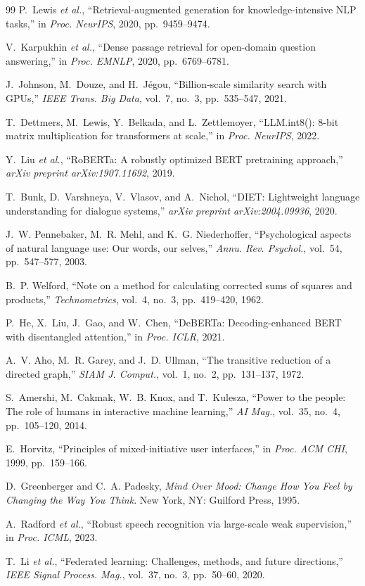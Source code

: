\documentclass[12pt, letterpaper]{article}
\begin{document}
\begin{thebibliography}{99}
P.~Lewis \textit{et al.},
``Retrieval-augmented generation for knowledge-intensive
NLP tasks,''
in \textit{Proc. NeurIPS}, 2020, pp.~9459--9474.

V.~Karpukhin \textit{et al.},
``Dense passage retrieval for open-domain question
answering,''
in \textit{Proc. EMNLP}, 2020, pp.~6769--6781.

J.~Johnson, M.~Douze, and H.~J\'{e}gou,
``Billion-scale similarity search with GPUs,''
\textit{IEEE Trans. Big Data},
vol.~7, no.~3, pp.~535--547, 2021.

T.~Dettmers, M.~Lewis, Y.~Belkada, and L.~Zettlemoyer,
``LLM.int8(): 8-bit matrix multiplication for transformers
at scale,''
in \textit{Proc. NeurIPS}, 2022.

Y.~Liu \textit{et al.},
``RoBERTa: A robustly optimized BERT pretraining approach,''
\textit{arXiv preprint arXiv:1907.11692}, 2019.

T.~Bunk, D.~Varshneya, V.~Vlasov, and A.~Nichol,
``DIET: Lightweight language understanding for dialogue
systems,''
\textit{arXiv preprint arXiv:2004.09936}, 2020.

J.~W. Pennebaker, M.~R. Mehl, and K.~G. Niederhoffer,
``Psychological aspects of natural language use: Our words,
our selves,''
\textit{Annu. Rev. Psychol.},
vol.~54, pp.~547--577, 2003.

B.~P. Welford,
``Note on a method for calculating corrected sums of squares
and products,''
\textit{Technometrics},
vol.~4, no.~3, pp.~419--420, 1962.

P.~He, X.~Liu, J.~Gao, and W.~Chen,
``DeBERTa: Decoding-enhanced BERT with disentangled
attention,''
in \textit{Proc. ICLR}, 2021.

A.~V. Aho, M.~R. Garey, and J.~D. Ullman,
``The transitive reduction of a directed graph,''
\textit{SIAM J. Comput.},
vol.~1, no.~2, pp.~131--137, 1972.

S.~Amershi, M.~Cakmak, W.~B. Knox, and T.~Kulesza,
``Power to the people: The role of humans in interactive
machine learning,''
\textit{AI Mag.}, vol.~35, no.~4, pp.~105--120, 2014.

E.~Horvitz,
``Principles of mixed-initiative user interfaces,''
in \textit{Proc. ACM CHI}, 1999, pp.~159--166.

D.~Greenberger and C.~A. Padesky,
\textit{Mind Over Mood: Change How You Feel by Changing
the Way You Think}.
New York, NY: Guilford Press, 1995.

A.~Radford \textit{et al.},
``Robust speech recognition via large-scale weak
supervision,''
in \textit{Proc. ICML}, 2023.

T.~Li \textit{et al.},
``Federated learning: Challenges, methods, and future
directions,''
\textit{IEEE Signal Process. Mag.},
vol.~37, no.~3, pp.~50--60, 2020.

\end{thebibliography}
\end{document}
